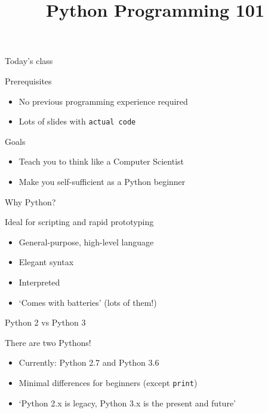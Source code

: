 

\title{Python Programming 101}



\maketitle

\begin{frame}{Today's class}
    \begin{block}{Prerequisites}
        \begin{itemize}
            \item No previous programming experience required
            \item Lots of slides with \texttt{actual code}
        \end{itemize}
    \end{block}
    \vfill
    \begin{block}{Goals}
        \begin{itemize}
            \item Teach you to think like a Computer Scientist
            \item Make you self\hyp{}sufficient as a Python beginner
        \end{itemize}
    \end{block}
\end{frame}

\begin{frame}[fragile]{Why Python?}
    \begin{block}{Ideal for scripting and rapid prototyping}
        \begin{itemize}
            \item General\hyp{}purpose, high\hyp{}level language
            \item Elegant syntax
            \item Interpreted
            \item `Comes with batteries' (lots of them!)
        \end{itemize}
    \end{block}
\end{frame}

\begin{frame}{Python 2 vs Python 3}
    \begin{block}{There are two Pythons!}
        \begin{itemize}
            \item Currently: Python 2.7 and Python 3.6
            \item Minimal differences for beginners
                  (except \texttt{print})
            \item `Python 2.x is legacy, Python 3.x is the present and future'
        \end{itemize}
    \end{block}
\end{frame}

